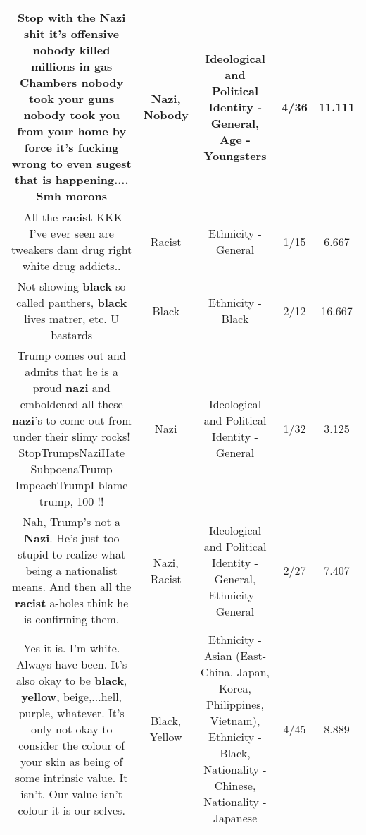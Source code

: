 \documentclass[11pt]{article}
\newlength\mylength
\begin{document}
\begin{center}
\begin{longtable}{|C{.65\mylength}|C{.30\mylength}|C{.12\mylength}|C{.12\mylength}|C{.12\mylength}|}
  \small Stop with the \textbf{Nazi} shit it's offensive \textbf{nobody} killed millions in gas Chambers \textbf{nobody} took your guns \textbf{nobody} took you from your home by force it's fucking wrong to even sugest that is happening.... Smh morons\normalsize   & Nazi, Nobody &  Ideological and Political Identity - General, Age - Youngsters & 4/36 & 11.111 \\  \hline
  \small 🤬All the \textbf{racist} KKK I've ever seen are tweakers dam drug right white drug addicts..\normalsize   & Racist & Ethnicity - General & 1/15 & 6.667 \\  \hline
  \small Not showing \textbf{black} so called panthers,  \textbf{black} lives matrer, etc. U bastards\normalsize   & Black & Ethnicity - Black & 2/12 & 16.667 \\  \hline
  \small Trump comes out and admits that he is a proud \textbf{nazi} and emboldened all these \textbf{nazi}'s to come out from under their slimy rocks! StopTrumpsNaziHate SubpoenaTrump ImpeachTrumpI blame trump, 100 !!\normalsize   & Nazi &  Ideological and Political Identity - General & 1/32 & 3.125 \\  \hline
  \small Nah, Trump's not a \textbf{Nazi}. He's just too stupid to realize what being a nationalist means. And then all the \textbf{racist} a-holes think he is confirming them.\normalsize   & Nazi, Racist &  Ideological and Political Identity - General, Ethnicity - General & 2/27 & 7.407 \\  \hline
  \small Yes it is. I'm white. Always have been. It's also okay to be \textbf{black}, \textbf{y\textbf{e\textbf{llow}}}, beige,...hell, purple, whatever. It's only not okay to consider the colour of your skin as being of some intrinsic value. It isn't.  Our value isn't colour it is our selves.\normalsize   & Black, Yellow & Ethnicity - Asian (East- China, Japan, Korea, Philippines, Vietnam), Ethnicity - Black, Nationality - Chinese, Nationality - Japanese & 4/45 & 8.889 \\  \hline

\end{longtable}
\end{center}
\end{document}
